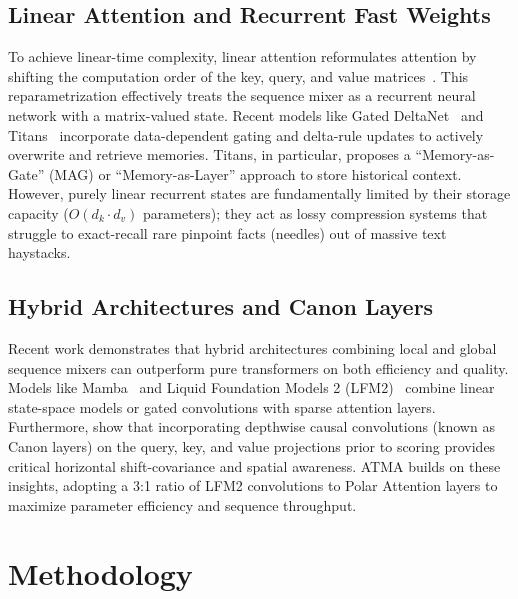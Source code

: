 \documentclass{article} %
\begin{document}
\subsection{Linear Attention and Recurrent Fast Weights}
To achieve linear-time complexity, linear attention reformulates attention by shifting the computation order of the key, query, and value matrices~\citep{deltanet2024}. This reparametrization effectively treats the sequence mixer as a recurrent neural network with a matrix-valued state. Recent models like Gated DeltaNet~\citep{deltanet2024} and Titans~\citep{titans2025} incorporate data-dependent gating and delta-rule updates to actively overwrite and retrieve memories. Titans, in particular, proposes a ``Memory-as-Gate'' (MAG) or ``Memory-as-Layer'' approach to store historical context. However, purely linear recurrent states are fundamentally limited by their storage capacity ($O(d_k \cdot d_v)$ parameters); they act as lossy compression systems that struggle to exact-recall rare pinpoint facts (needles) out of massive text haystacks.

\subsection{Hybrid Architectures and Canon Layers}
Recent work demonstrates that hybrid architectures combining local and global sequence mixers can outperform pure transformers on both efficiency and quality. Models like Mamba~\citep{mamba2023} and Liquid Foundation Models 2 (LFM2)~\citep{lfm2_2025} combine linear state-space models or gated convolutions with sparse attention layers. Furthermore, \citet{physics_lms_2025} show that incorporating depthwise causal convolutions (known as Canon layers) on the query, key, and value projections prior to scoring provides critical horizontal shift-covariance and spatial awareness. ATMA builds on these insights, adopting a 3:1 ratio of LFM2 convolutions to Polar Attention layers to maximize parameter efficiency and sequence throughput.

\section{Methodology}
\end{document}
